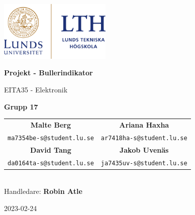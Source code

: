 \begin{titlepage}
    \begin{center}
        \vspace*{1cm}
        \includegraphics[width=0.4\textwidth]{bilder/lth_logo.png}
        \vspace*{1.5cm}
        
        \Huge
        \textbf{Projekt - Bullerindikator}
        
        \vspace{0.5cm}
        \LARGE
        EITA35 - Elektronik
        
        \vspace{1.5cm}
        \Large
        \textbf{Grupp 17}\\
        \vspace{0.5cm}
        \begin{tabular}{cc}
            \textbf{Malte Berg} & \textbf{Ariana Haxha} \\
            {\normalsize\texttt{ma7354be-s@student.lu.se}} & {\normalsize\texttt{ar7418ha-s@student.lu.se}} \\
            \textbf{David Tang} & \textbf{Jakob Uvenäs} \\
            {\normalsize\texttt{da0164ta-s@student.lu.se}} & {\normalsize\texttt{ja7435uv-s@student.lu.se}} \\
        \end{tabular}
        \\
        \vspace{1.5cm}
        \large Handledare: \textbf{Robin Atle}
        
        \vspace{1cm}

        2023-02-24
        
        \vfill
        
  
    \end{center}
\end{titlepage}